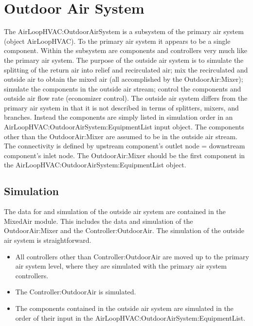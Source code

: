 \section{Outdoor Air System}\label{outdoor-air-system}

The AirLoopHVAC:OutdoorAirSystem is a subsystem of the primary air system (object AirLoopHVAC). To the primary air system it appears to be a single component. Within the subsystem are components and controllers very much like the primary air system. The purpose of the outside air system is to simulate the splitting of the return air into relief and recirculated air; mix the recirculated and outside air to obtain the mixed air (all accomplished by the OutdoorAir:Mixer); simulate the components in the outside air stream; control the components and outside air flow rate (economizer control). The outside air system differs from the primary air system in that it is not described in terms of splitters, mixers, and branches. Instead the components are simply listed in simulation order in an AirLoopHVAC:OutdoorAirSystem:EquipmentList input object. The components other than the OutdoorAir:Mixer are assumed to be in the outside air stream. The connectivity is defined by upstream component's outlet node = downstream component's inlet node. The OutdoorAir:Mixer should be the first component in the AirLoopHVAC:OutdoorAirSystem:EquipmentList object.

\subsection{Simulation}\label{simulation-002}

The data for and simulation of the outside air system are contained in the MixedAir module. This includes the data and simulation of the OutdoorAir:Mixer and the Controller:OutdoorAir. The simulation of the outside air system is straightforward.

\begin{itemize}
\item
  All controllers other than Controller:OutdoorAir are moved up to the primary air system level, where they are simulated with the primary air system controllers.
\item
  The Controller:OutdoorAir is simulated.
\item
  The components contained in the outside air system are simulated in the order of their input in the AirLoopHVAC:OutdoorAirSystem:EquipmentList.
\end{itemize}
